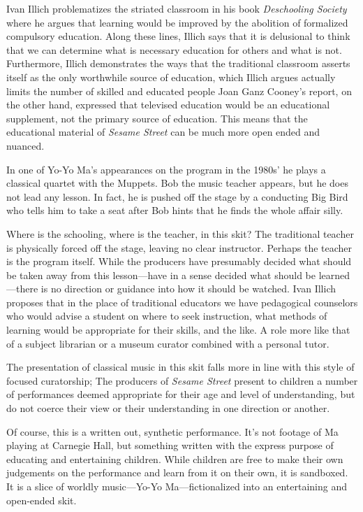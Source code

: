 \documentclass[12pt,letterpaper]{article}
\newcommand{\ses}{\textit{Sesame Street }}
\begin{document}
	Ivan Illich problematizes the striated classroom in his book
	\textit{Deschooling Society} where he argues
	that learning would be improved by the abolition of formalized
	compulsory education. Along these lines, Illich says that it is 
	delusional to think that we can determine what is necessary education 
	for others and what is not.\autocite[12]{Illich} Furthermore, Illich 
	demonstrates the ways that the traditional classroom asserts itself as
	the only worthwhile source of education, which Illich argues actually 
	limits the number of skilled and educated people\autocite[39]{Illich} 
	Joan Ganz Cooney's report, on the other hand, expressed that televised
	education would be an educational supplement, not the primary source of
	education. This means that the educational material of \ses can be much
	more open ended and nuanced. 

	In one of Yo-Yo Ma's appearances on the program in the 1980s' he plays
	a classical quartet with the Muppets. Bob the music teacher appears, 
	but he does not lead any lesson. In fact, he is pushed off the stage by 
	a conducting Big Bird who tells him to take a seat after Bob hints that
	he finds the whole affair silly.

	Where is the schooling, where is the teacher, in this skit? The 
	traditional teacher is physically forced off the stage, leaving no clear
	instructor.  Perhaps the teacher is the program itself.  While the 
	producers have presumably decided what should be taken away from this 
	lesson---have in a sense decided what should be learned---there is no 
	direction or guidance into how it should be watched. Ivan Illich
	proposes that in the place of traditional educators we have
	pedagogical counselors who would advise a student on where to seek 
	instruction, what methods of learning would be appropriate for their 
	skills, and the like. A role more like that of a subject librarian or a 
	museum curator combined with a personal tutor.\autocite[43]{Illich}

	The presentation of classical music in this skit falls more in line with
	this style of focused curatorship; The producers of \textit{Sesame 
	Street} present to children a number of performances deemed appropriate
	for their age and level of understanding, but do not coerce their view 
	or their understanding in one direction or another.


	Of course, this is a written out, synthetic performance. It's not 
	footage of Ma playing at Carnegie Hall, but something written with the 
	express purpose of educating and entertaining children. While children 
	are free to make their own judgements on the performance and learn from
	it on their own, it is sandboxed. It is a slice of worldly music---Yo-Yo
	Ma---fictionalized into an entertaining and open-ended skit. 
\end{document}
